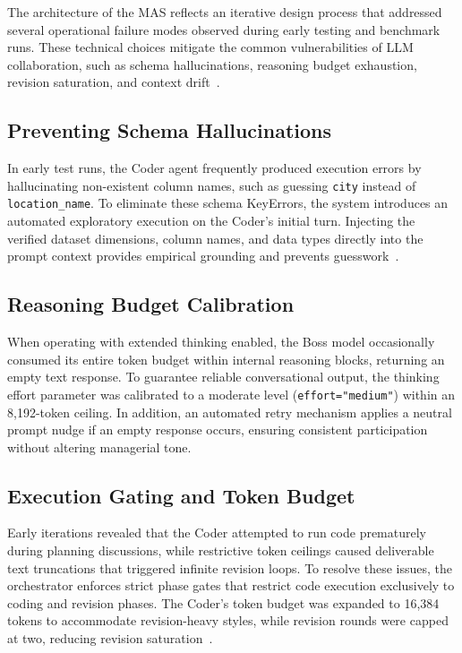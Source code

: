 The architecture of the \ac{MAS} reflects an iterative design process that addressed several operational failure modes observed during early testing and benchmark runs.
These technical choices mitigate the common vulnerabilities of \ac{LLM} collaboration, such as schema hallucinations, reasoning budget exhaustion, revision saturation, and context drift~\cite{yehudai2026surveyevaluationllmbasedagents, guo2024largelanguagemodelbased}.

\subsection{Preventing Schema Hallucinations}
\label{subsec:preventing-schema-hallucinations}

In early test runs, the Coder agent frequently produced execution errors by hallucinating non-existent column names, such as guessing \texttt{city} instead of \texttt{location\_name}.
To eliminate these schema KeyErrors, the system introduces an automated exploratory execution on the Coder's initial turn.
Injecting the verified dataset dimensions, column names, and data types directly into the prompt context provides empirical grounding and prevents guesswork~\cite{white2023promptpatterncatalogenhance, qian2024chatdevcommunicativeagentssoftware}.

\subsection{Reasoning Budget Calibration}
\label{subsec:reasoning-budget-calibration}

When operating with extended thinking enabled, the Boss model occasionally consumed its entire token budget within internal reasoning blocks, returning an empty text response.
To guarantee reliable conversational output, the thinking effort parameter was calibrated to a moderate level (\texttt{effort="medium"}) within an 8,192-token ceiling.
In addition, an automated retry mechanism applies a neutral prompt nudge if an empty response occurs, ensuring consistent participation without altering managerial tone.

\subsection{Execution Gating and Token Budget}
\label{subsec:execution-gating-token-budget}

Early iterations revealed that the Coder attempted to run code prematurely during planning discussions, while restrictive token ceilings caused deliverable text truncations that triggered infinite revision loops.
To resolve these issues, the orchestrator enforces strict phase gates that restrict code execution exclusively to coding and revision phases.
The Coder's token budget was expanded to 16,384 tokens to accommodate revision-heavy styles, while revision rounds were capped at two, reducing revision saturation~\cite{qian2024chatdevcommunicativeagentssoftware}.

